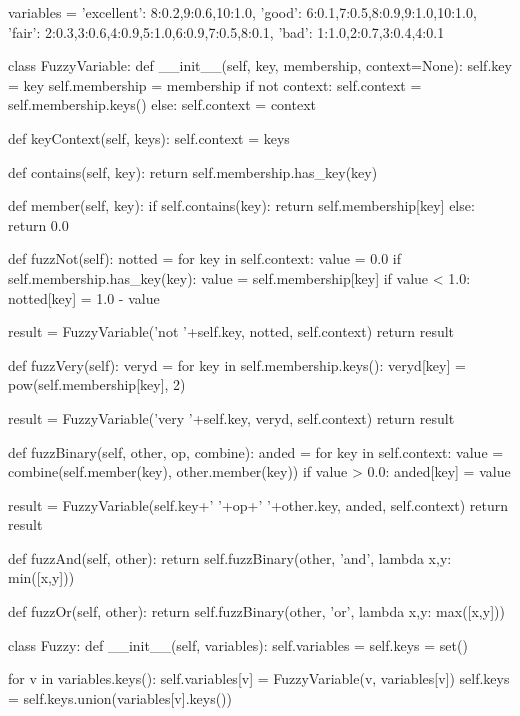 \documentclass[12pt]{article}
\begin{document}
\begin{python}[]
variables = {
    'excellent': {8:0.2,9:0.6,10:1.0},
    'good': {6:0.1,7:0.5,8:0.9,9:1.0,10:1.0},
    'fair': {2:0.3,3:0.6,4:0.9,5:1.0,6:0.9,7:0.5,8:0.1},
    'bad': {1:1.0,2:0.7,3:0.4,4:0.1}
}

class FuzzyVariable:
    def __init__(self, key, membership, context=None):
        self.key = key
        self.membership = membership
        if not context:
            self.context = self.membership.keys()
        else:
            self.context = context

    def keyContext(self, keys):
        self.context = keys

    def contains(self, key):
        return self.membership.has_key(key)

    def member(self, key):
        if self.contains(key):
            return self.membership[key]
        else:
            return 0.0

    def fuzzNot(self):
        notted = {}
        for key in self.context:
            value = 0.0
            if self.membership.has_key(key):
                value = self.membership[key]
            if value < 1.0:
                notted[key] = 1.0 - value

        result = FuzzyVariable('not '+self.key, notted, self.context)
        return result

    def fuzzVery(self):
        veryd = {}
        for key in self.membership.keys():
            veryd[key] = pow(self.membership[key], 2)

        result = FuzzyVariable('very '+self.key, veryd, self.context)
        return result

    def fuzzBinary(self, other, op, combine):
        anded = {}
        for key in self.context:
            value = combine(self.member(key), other.member(key))
            if value > 0.0:
                anded[key] = value

        result = FuzzyVariable(self.key+' '+op+' '+other.key, anded, self.context)
        return result

    def fuzzAnd(self, other):
        return self.fuzzBinary(other, 'and', lambda x,y: min([x,y]))

    def fuzzOr(self, other):
        return self.fuzzBinary(other, 'or', lambda x,y: max([x,y]))

class Fuzzy:
    def __init__(self, variables):
        self.variables = {}
        self.keys = set()

        for v in variables.keys():
            self.variables[v] = FuzzyVariable(v, variables[v])
            self.keys = self.keys.union(variables[v].keys())


\end{python}
\end{document}
